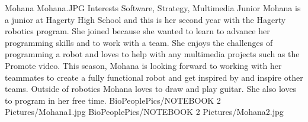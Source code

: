 \insertbio
{Mohana}
{Mohana.JPG}
{Interests}
{Software, Strategy, Multimedia}
{Junior}
{  
Mohana is a junior at Hagerty High School and this is her second year with the Hagerty robotics program. She joined because she wanted to learn to advance her programming skills and to work with a team. She enjoys the challenges of programming a robot and loves to help with any multimedia projects such as the Promote video. This season, Mohana is looking forward to working with her teammates to create a fully functional robot and get inspired by and inspire other teams. Outside of robotics Mohana loves to draw and play guitar. She also loves to program in her free time.  
}
{BioPeoplePics/NOTEBOOK 2 Pictures/Mohana1.jpg}
{BioPeoplePics/NOTEBOOK 2 Pictures/Mohana2.jpg}